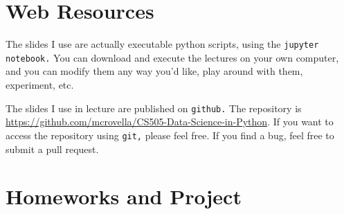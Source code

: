 \documentclass[11pt]{article}
\begin{document}
\section*{Web Resources} 

The slides I use are actually executable python scripts, using the
\texttt{jupyter notebook.}   You can
download and execute the lectures on your own computer, and you can
modify them any way you'd like, play around with them, experiment, etc.

The slides I use in lecture are published on \texttt{github.}   The
repository is
\url{https://github.com/mcrovella/CS505-Data-Science-in-Python}.  If you want
to access the repository using \texttt{git,} please feel free.   If you
find a bug, feel free to submit a pull request.
 
\section*{Homeworks and Project}
\end{document}
